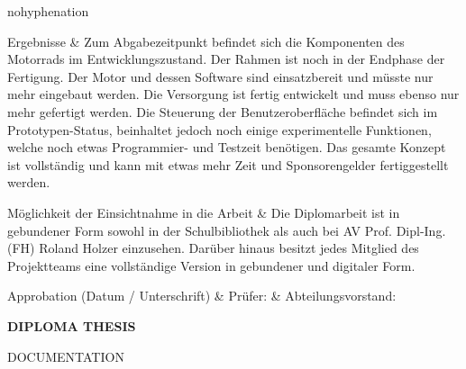 {\begin{hyphenrules}{nohyphenation}
\begin{center}
		\begin{mytable}
			Ergebnisse & Zum Abgabezeitpunkt befindet sich die Komponenten des Motorrads im Entwicklungszustand. Der Rahmen ist noch in der Endphase der Fertigung. Der Motor und dessen Software sind einsatzbereit und müsste nur mehr eingebaut werden. Die Versorgung ist fertig entwickelt und muss ebenso nur mehr gefertigt werden. Die Steuerung der Benutzeroberfläche befindet sich im Prototypen-Status, beinhaltet jedoch noch einige experimentelle Funktionen, welche noch etwas Programmier- und Testzeit benötigen. Das gesamte Konzept ist vollständig und kann mit etwas mehr Zeit und Sponsorengelder fertiggestellt werden.\\
		\end{mytable}\vskip-0.42cm
		\begin{mytable}
			Möglichkeit der Einsichtnahme in die Arbeit & Die Diplomarbeit ist in gebundener Form sowohl in der Schulbibliothek als auch bei AV Prof. Dipl-Ing. (FH) Roland Holzer einzusehen. Darüber hinaus besitzt jedes Mitglied des Projektteams eine vollständige Version in gebundener und digitaler Form.\\
		\end{mytable}\vskip-0.42cm
		\begin{mytable}[{|X[0.995,c]|X[1,m]|X[1,m]|}]
			Approbation \newline (Datum / Unterschrift) &
			\hbox{\footnotesize{Prüfer:}} &
			\hbox{\footnotesize{Abteilungsvorstand:}} \\
			\hline
		\end{mytable}
	\end{center}
\end{hyphenrules}	
	
\newpage
	
\begin{center}
\begin{huge}
	\textbf{DIPLOMA THESIS}
\end{huge}

\begin{large}
	DOCUMENTATION
\end{large}
\end{center}

}
